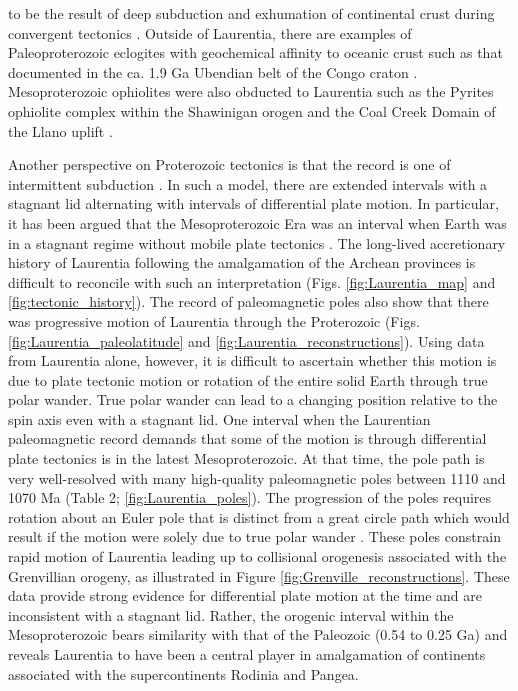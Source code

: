 \documentclass[twocolumn, switch]{article} %
\begin{document}
to be the result of deep subduction and exhumation of continental crust during convergent tectonics \citep{Weller2017a}. Outside of Laurentia, there are examples of Paleoproterozoic eclogites with geochemical affinity to oceanic crust such as that documented in the ca. 1.9 Ga Ubendian belt of the Congo craton \citep{Boniface2012a}. Mesoproterozoic ophiolites were also obducted to Laurentia such as the Pyrites ophiolite complex within the Shawinigan orogen and the Coal Creek Domain of the Llano uplift \citep{Chiarenzelli2011a, McLelland2013a}.

Another perspective on Proterozoic tectonics is that the record is one of intermittent subduction \citep{Silver2008a, ONeill2013a}. In such a model, there are extended intervals with a stagnant lid alternating with intervals of differential plate motion. In particular, it has been argued that the Mesoproterozoic Era was an interval when Earth was in a stagnant regime without mobile plate tectonics \citep{Silver2008a, ONeill2013a}. The long-lived accretionary history of Laurentia following the amalgamation of the Archean provinces is difficult to reconcile with such an interpretation (Figs. \ref{fig:Laurentia_map} and \ref{fig:tectonic_history}). The record of paleomagnetic poles also show that there was progressive motion of Laurentia through the Proterozoic (Figs. \ref{fig:Laurentia_paleolatitude} and \ref{fig:Laurentia_reconstructions}). Using data from Laurentia alone, however, it is difficult to ascertain whether this motion is due to plate tectonic motion or rotation of the entire solid Earth through true polar wander. True polar wander can lead to a changing position relative to the spin axis even with a stagnant lid. One interval when the Laurentian paleomagnetic record demands that some of the motion is through differential plate tectonics is in the latest Mesoproterozoic. At that time, the pole path is very well-resolved with many high-quality paleomagnetic poles between 1110 and 1070 Ma (Table 2; \ref{fig:Laurentia_poles}). The progression of the poles requires rotation about an Euler pole that is distinct from a great circle path which would result if the motion were solely due to true polar wander \citep{Swanson-Hysell2019a}. These poles constrain rapid motion of Laurentia leading up to collisional orogenesis associated with the Grenvillian orogeny, as illustrated in Figure \ref{fig:Grenville_reconstructions}. These data provide strong evidence for differential plate motion at the time and are inconsistent with a stagnant lid. Rather, the orogenic interval within the Mesoproterozoic bears similarity with that of the Paleozoic (0.54 to 0.25 Ga) and reveals Laurentia to have been a central player in amalgamation of continents associated with the supercontinents Rodinia and Pangea.
\end{document}
